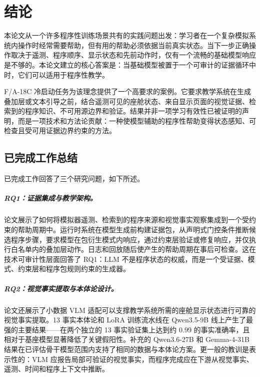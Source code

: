 %
\chapter{结论}\label{ch:conclusion}

本论文从一个许多程序性训练场景共有的实践问题出发：学习者在一个复杂模拟系统内操作时经常需要帮助，但有用的帮助必须依据当前真实状态。当下一步正确操作取决于遥测、程序顺序、显示状态和先前动作时，仅有一个流畅的基础模型响应是不够的。本论文建立的核心答案是：当基础模型被置于一个可审计的证据循环中时，它们可以适用于程序性教学。

F/A-18C 冷启动任务为该理念提供了一个高要求的案例。它要求教学系统在生成叠加层或文本引导之前，结合遥测可见的座舱状态、来自显示页面的视觉证据、检索到的程序知识、不可用源边界和验证。结果并非一项学习有效性已被证明的声明，而是一项技术和方法论贡献：一种使模型辅助的程序性帮助变得状态感知、可检查且受可用证据边界约束的方法。

\section{已完成工作总结}\label{sec:conc-summary}

已完成工作回答了三个研究问题，如下所述。

\paragraph{RQ1：证据集成与教学架构。}论文展示了如何将模拟器遥测、检索到的程序来源和视觉事实观察集成到一个受约束的帮助周期中。运行时系统在模型生成前构建证据包，从声明式门控条件推断候选程序步骤，要求模型在包衍生模式内响应，通过约束层验证或修复响应，并仅执行白名单内的叠加层动作。日志和回放随后使产生的帮助周期在事后可检查。这在技术可审计性层面回答了 RQ1：LLM 不是程序状态的权威，而是一个受证据、模式、约束层和程序包规则约束的生成器。

\paragraph{RQ2：视觉事实提取与本体论设计。}论文还展示了小数据 VLM 适配可以支撑教学系统所需的座舱显示状态进行可靠的视觉事实提取。13 事实本体论和 LoRA 训练流水线在 Qwen3.5-9B 线上产生了最强的主要结果——在两个独立的 13 事实验证集上达到约 0.99 的事实准确率，且相对于基座模型显著降低了关键假阳性。补充的 Qwen3.6-27B 和 Gemma-4-31B 结果在已评估骨干模型范围内支持了相同的数据与本体论方案。更一般的教训是表示性的：VLM 应报告局部可验证的视觉事实，而程序完成应在下游从视觉事实、遥测、时间和程序上下文中推断。

